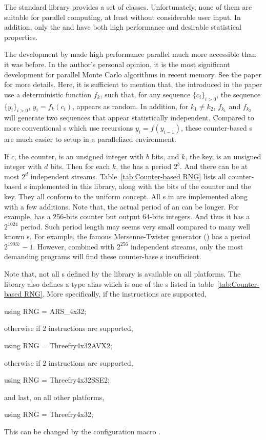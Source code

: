\documentclass[11pt,bib,mint,hyper,altcolor]{marticle}
\begin{document}
The standard library provides a set of \rng classes. Unfortunately, none of
them are suitable for parallel computing, at least without considerable user
input. In addition, only the  and
 have both high performance and desirable
statistical properties.

The development by \textcite{Salmon:2011um} made high performance parallel \rng
much more accessible than it was before. In the author's personal opinion, it
is the most significant development for parallel Monte Carlo algorithms in
recent memory. See the paper for more details. Here, it is sufficient to
mention that, the \rng introduced in the paper use a deterministic function
$f_k$, such that, for any sequence $\{c_i\}_{i>0}$, the sequence
$\{y_i\}_{i>0}$, $y_i = f_k(c_i)$, appears as random. In addition, for $k_1 \ne
k_2$, $f_{k_1}$ and $f_{k_2}$ will generate two sequences that appear
statistically independent. Compared to more conventional \rng{}s which use
recursions $y_i = f(y_{i - 1})$, these counter-based \rng{}s are much easier to
setup in a parallelized environment.

If $c$, the counter, is an unsigned integer with $b$ bits, and $k$, the key, is
an unsigned integer with $d$ bits. Then for each $k$, the \rng has a period
$2^b$. And there can be at most $2^d$ independent streams.
Table~\ref{tab:Counter-based RNG} lists all counter-based \rng{}s implemented
in this library, along with the bits of the counter and the key. They all
conform to the \cppoo uniform \rng concept. All \rng{}s in
\textcite{Salmon:2011um} are implemented along with a few additions. Note that,
the actual period of an \rng can be longer. For example, 
has a 256-bits counter but output 64-bits integers. And thus it has a
$2^{1024}$ period. Such period length may seems very small compared to many
well known \rng{}s. For example, the famous Mersenne-Twister generator
() has a period $2^{19937} - 1$. However, combined with
$2^{256}$ independent streams, only the most demanding programs will find these
counter-base \rng{}s insufficient.

Note that, not all \rng{}s defined by the library is available on all
platforms. The library also defines a type alias  which is one
of the \rng{}s listed in table~\ref{tab:Counter-based RNG}. More specifically,
if the \aesni instructions are supported,
\begin{cppcode}
  using RNG = ARS_4x32;
\end{cppcode}
otherwise if \avx{}2 instructions are supported,
\begin{cppcode}
  using RNG = Threefry4x32AVX2;
\end{cppcode}
otherwise if \sse{}2 instructions are supported,
\begin{cppcode}
  using RNG = Threefry4x32SSE2;
\end{cppcode}
and last, on all other platforms,
\begin{cppcode}
  using RNG = Threefry4x32;
\end{cppcode}
This can be changed by the configuration macro .
\end{document}
